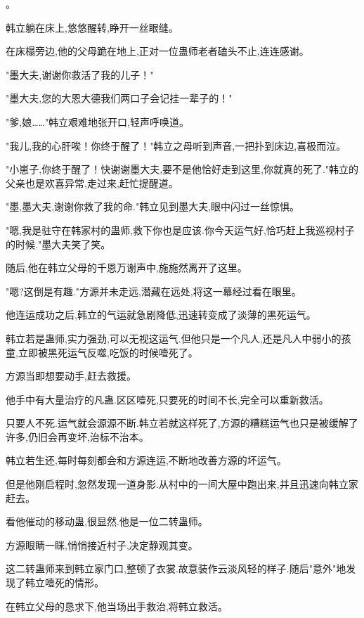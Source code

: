 
\begin{this_body}

。

韩立躺在床上,悠悠醒转,睁开一丝眼缝。

在床榻旁边,他的父母跪在地上,正对一位蛊师老者磕头不止,连连感谢。

"墨大夫,谢谢你救活了我的儿子！"

"墨大夫,您的大恩大德我们两口子会记挂一辈子的！"

"爹,娘……"韩立艰难地张开口,轻声呼唤道。

"我儿,我的心肝唉！你终于醒了！"韩立之母听到声音,一把扑到床边,喜极而泣。

"小崽子,你终于醒了！快谢谢墨大夫,要不是他恰好走到这里,你就真的死了."韩立的父亲也是欢喜异常,走过来,赶忙提醒道。

"墨,墨大夫,谢谢你救了我的命."韩立见到墨大夫,眼中闪过一丝惊惧。

"嗯,我是驻守在韩家村的蛊师,救下你也是应该.你今天运气好,恰巧赶上我巡视村子的时候."墨大夫笑了笑。

随后,他在韩立父母的千恩万谢声中,施施然离开了这里。

"嗯?这倒是有趣."方源并未走远,潜藏在远处,将这一幕经过看在眼里。

他连运成功之后,韩立的气运就急剧降低,迅速转变成了淡薄的黑死运气。

韩立若是蛊师,实力强劲,可以无视这运气.但他只是一个凡人,还是凡人中弱小的孩童,立即被黑死运气反噬,吃饭的时候噎死了。

方源当即想要动手,赶去救援。

他手中有大量治疗的凡蛊.区区噎死,只要死的时间不长,完全可以重新救活。

只要人不死.运气就会源源不断.韩立若就这样死了,方源的糟糕运气也只是被缓解了许多,仍旧会再变坏,治标不治本。

韩立若生还,每时每刻都会和方源连运,不断地改善方源的坏运气。

但是他刚启程时,忽然发现一道身影.从村中的一间大屋中跑出来,并且迅速向韩立家赶去。

看他催动的移动蛊,很显然.他是一位二转蛊师。

方源眼睛一眯,悄悄接近村子,决定静观其变。

这二转蛊师来到韩立家门口,整顿了衣裳.故意装作云淡风轻的样子.随后"意外"地发现了韩立噎死的情形。

在韩立父母的恳求下,他当场出手救治,将韩立救活。


\end{this_body}

